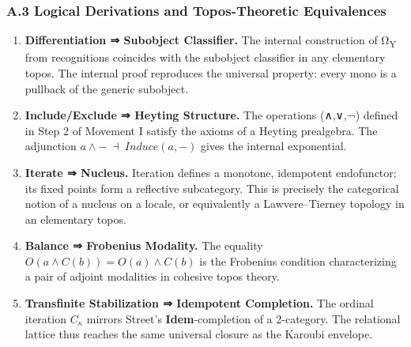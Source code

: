 \documentclass[11pt]{article}
\begin{document}
\subsubsection*{A.3 Logical Derivations and Topos-Theoretic Equivalences}
\label{sec:orgb288256}
\begin{enumerate}
\item \textbf{\textbf{Differentiation ⇒ Subobject Classifier.}}  
The internal construction of Ω\textsubscript{Y} from recognitions coincides with the subobject classifier in any elementary topos.  
The internal proof reproduces the universal property: every mono is a pullback of the generic subobject.

\item \textbf{\textbf{Include/Exclude ⇒ Heyting Structure.}}  
The operations (∧,∨,¬) defined in Step 2 of Movement I satisfy the axioms of a Heyting prealgebra.  
The adjunction \(a∧-\ ⊣\ Induce(a,-)\) gives the internal exponential.

\item \textbf{\textbf{Iterate ⇒ Nucleus.}}  
Iteration defines a monotone, idempotent endofunctor; its fixed points form a reflective subcategory.  
This is precisely the categorical notion of a nucleus on a locale,  
or equivalently a Lawvere–Tierney topology in an elementary topos.

\item \textbf{\textbf{Balance ⇒ Frobenius Modality.}}  
The equality \(O(a ∧ C(b)) = O(a) ∧ C(b)\) is the Frobenius condition characterizing  
a pair of adjoint modalities in cohesive topos theory.

\item \textbf{\textbf{Transfinite Stabilization ⇒ Idempotent Completion.}}  
The ordinal iteration \(C_κ\) mirrors Street’s \textbf{Idem}-completion of a 2-category.  
The relational lattice thus reaches the same universal closure as the Karoubi envelope.
\end{enumerate}
\end{document}
